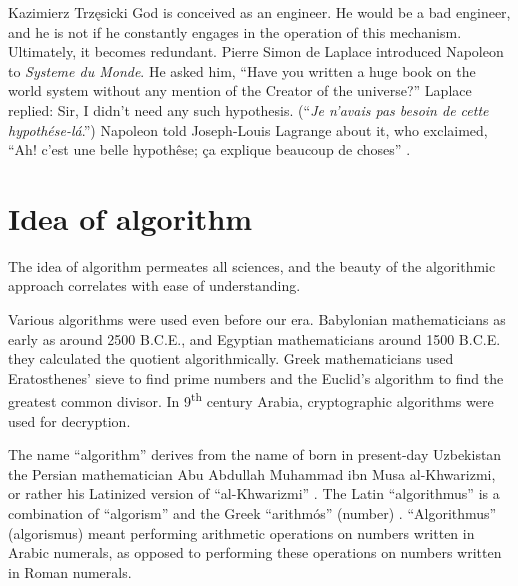 \begin{artengenv}{Kazimierz Trzęsicki}
God is conceived as an engineer. He would be a bad engineer, and he is not if he constantly engages in the operation of this mechanism. Ultimately, it becomes redundant. Pierre Simon de Laplace introduced Napoleon to \emph{Systeme du Monde}. He asked him, ``Have you written a huge book on the world system without any mention of the Creator of the universe?'' Laplace replied: Sir, I didn't need any such hypothesis. (``\textit{Je n'avais pas besoin de cette hypoth{\'e}se-l{\'a}}.'') Napoleon told Joseph-Louis Lagrange about it, who exclaimed, ``Ah! c'est une belle hypoth{\^e}se; \c{c}a explique beaucoup de choses'' \parencite[pp.249--250]{Morgan1872}.



\section{Idea of algorithm} 

The idea of algorithm permeates all sciences, and the beauty of the algorithmic approach correlates with ease of understanding.

Various algorithms were used even before our era. Babylonian mathematicians as early as around 2500 B.C.E., and Egyptian mathematicians around 1500 B.C.E. they calculated the quotient algorithmically. Greek mathematicians used Eratosthenes' sieve to find prime numbers and the Euclid's algorithm to find the greatest common divisor. In 9\textsuperscript{th} century Arabia, cryptographic algorithms were used for decryption.


The name ``algorithm'' derives from the name of born in present-day Uzbekistan the Persian mathematician  Abu Abdullah Muhammad ibn Musa al-Khwarizmi,  or rather his Latinized version of ``al-Khwarizmi'' \parencite[p.1]{Knuth1997}. The Latin ``algorithmus'' is a combination of ``algorism'' and the Greek ``arithm{\'o}s'' (number) \parencite[p.14]{Marciszewski1981}. ``Algorithmus'' (algorismus) meant performing arithmetic operations on numbers written in Arabic numerals, as opposed to performing these operations on numbers written in Roman numerals.



\end{artengenv}
